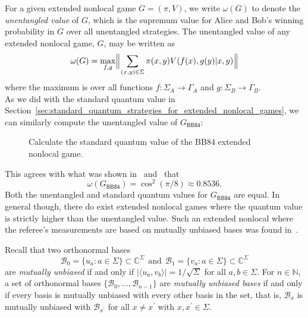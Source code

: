 \documentclass[nofootinbib,superscriptaddress,a4paper,twocolumn,longbibliography,floatfix,pra]{revtex4-2}
\newcommand{\tinyspace}{\mspace{1mu}}
\renewcommand{\abs}[1]{\lvert #1 \rvert}
\renewcommand{\ip}[2]{\langle #1 , #2\rangle}
\newcommand{\Bignorm}[1]{\Bigl\lVert\tinyspace #1 \tinyspace\Bigr\rVert}
\newcommand{\complex}{\mathbb{C}}
\renewcommand{\natural}{\mathbb{N}}
\newcommand{\B}{\mathcal{B}}
\def\BB84{\mathsf{BB84}}
\begin{document}
For a given extended nonlocal game $G = (\pi, V)$, we write $\omega(G)$ to
denote the \emph{unentangled value} of $G$, which is the supremum value for
Alice and Bob's winning probability in $G$ over all unentangled strategies. The
unentangled value of any extended nonlocal game, $G$, may be written as
\begin{equation}
    \omega(G) = \max_{f,g} \Bignorm{\sum_{(x,y) \in \Sigma} \pi(x,y) V(f(x),
    g(y)|x,y)}
\end{equation}
where the maximum is over all functions $f : \Sigma_A \rightarrow \Gamma_A$ and
$g : \Sigma_B \rightarrow \Gamma_B$.
\\

As we did with the standard quantum value in
Section~\ref{sec:standard_quantum_strategies_for_extended_nonlocal_games}, we
can similarly compute the unentangled value of $G_{\BB84}$:
\begin{figure}[!htpb]
    \centering
            
    \caption{Calculate the standard quantum value of the BB84 extended nonlocal
    game.}
    \label{fig:bb84_game_unentangled}
\end{figure}
This agrees with what was shown in~\cite{tomamichel2013monogamy}
and~\cite{johnston2016extended} that
\begin{equation}
    \omega(G_{\BB84}) = \cos^2(\pi/8) \approx 0.8536.
\end{equation}
Both the unentangled and standard quantum values for $G_{\BB84}$ are equal. In
general though, there do exist extended nonlocal games where the quantum value
is strictly higher than the unentangled value. Such an extended nonlocal where
the referee's measurements are based on mutually unbiased bases was found
in~\cite{johnston2016extended}.

Recall that two orthonormal bases
\begin{equation*}
    \B_0 = \{u_a : a \in \Sigma\} \subset \complex^{\Sigma} \ \ 
    \text{and} \ \
    \B_1 = \{v_a : a \in \Sigma\} \subset \complex^{\Sigma}
\end{equation*}
are \emph{mutually unbiased} if and only if $\abs{\ip{u_a}{v_b}} =
1/\sqrt{\Sigma}$ for all $a, b \in \Sigma$.  For $n \in \natural$, a set of
orthonormal bases $\{\B_0, \ldots, \B_{n-1}\}$ are \emph{mutually unbiased
bases} if and only if every basis is mutually unbiased with every other basis
in the set, that is, $\B_x$ is mutually unbiased with $\B_{x^{\prime}}$ for all
$x \not= x^{\prime}$ with $x, x^{\prime} \in \Sigma$.
\end{document}
